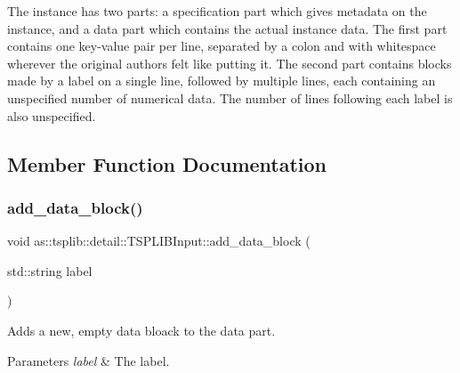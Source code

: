 The instance has two parts\+: a specification part which gives metadata on the instance, and a data part which contains the actual instance data. The first part contains one key-\/value pair per line, separated by a colon and with whitespace wherever the original authors felt like putting it. The second part contains blocks made by a label on a single line, followed by multiple lines, each containing an unspecified number of numerical data. The number of lines following each label is also unspecified. 

\subsection{Member Function Documentation}
\mbox{\label{classas_1_1tsplib_1_1detail_1_1TSPLIBInput_acd4def3a1df62f904de3bd9692ae7543}} 
\subsubsection{\texorpdfstring{add\+\_\+data\+\_\+block()}{add\_data\_block()}}
{\footnotesize\ttfamily void as\+::tsplib\+::detail\+::\+T\+S\+P\+L\+I\+B\+Input\+::add\+\_\+data\+\_\+block (\begin{DoxyParamCaption}\item[{std\+::string}]{label }\end{DoxyParamCaption})\hspace{0.3cm}{\ttfamily [inline]}}



Adds a new, empty data bloack to the data part. 


\begin{DoxyParams}{Parameters}
{\em label} & The label. \\
\hline
\end{DoxyParams}
\mbox{\label{classas_1_1tsplib_1_1detail_1_1TSPLIBInput_a36eb4a615d783273c4395b8554e7448c}} 
